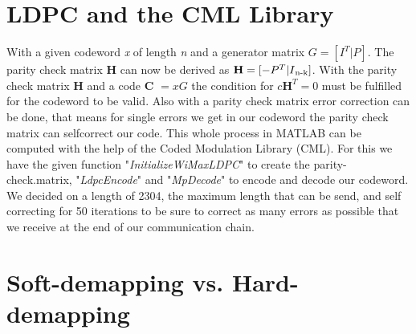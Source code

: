 \documentclass[12pt,oneside, reqno]{report}
\begin{document}
\section{LDPC and the CML Library}
With a given codeword \textit{x} of length \textit{n} and a generator matrix $G = [I^T|P]$. The parity check matrix \textbf{H} can now be derived as $\textbf{H} = [-P^T|I\textsubscript{n-k}]$. With the parity check matrix \textbf{H} and a code \textbf{C} $= xG$ the condition for $c\textbf{H}^T = 0$ must be fulfilled for the codeword to be valid. 
\newline 
Also with a parity check matrix error correction can be done, that means for single errors we get in our codeword the parity check matrix can selfcorrect our code.
This whole process in MATLAB can be computed with the help of the Coded Modulation Library (CML). For this we have the given function "\textit{InitializeWiMaxLDPC}" to create the parity-check.matrix, "\textit{LdpcEncode}" and "\textit{MpDecode}" to encode and decode our codeword.
We decided on a length of 2304, the maximum length that can be send, and self correcting for 50 iterations to be sure to correct as many errors as possible that we receive at the end of our communication chain.

\section{Soft-demapping vs. Hard-demapping}
\end{document}
